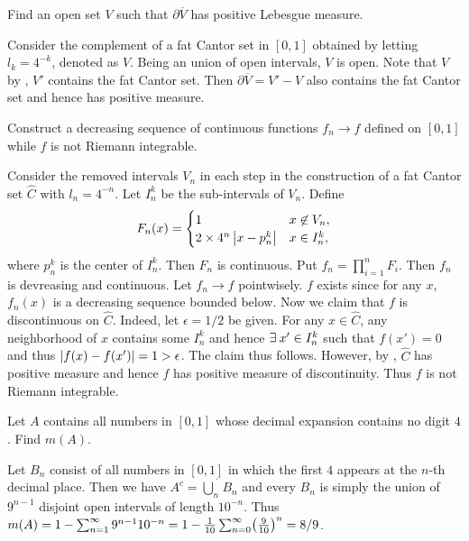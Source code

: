 \begin{exercise}
    Find an open set $V$ such that $\partial \overline{V}$ has 
    positive Lebesgue measure.
\end{exercise}
\begin{pf}
    Consider the complement of a fat Cantor set in $[0,1]$ 
    obtained by letting $l_k = 4^{-k}$, denoted as $V$. 
    Being an union of open intervals, $V$ is open. Note that 
    $V$ by , $V'$ contains the fat Cantor set. 
    Then $\partial \overline{V} = V'-V$ also contains the fat
    Cantor set and hence has positive measure.
\end{pf}

\begin{exercise}
    Construct a decreasing sequence of continuous functions 
    $f_n\to f$ defined on $[0,1]$ while $f$ is not Riemann 
    integrable.
\end{exercise}
\begin{pf}
    Consider the removed intervals $V_n$ in each step in the 
    construction of a fat Cantor set $\hat{C}$ with 
    $l_n = 4^{-n}$. Let $I^k_n$ be the sub-intervals of $V_n$. 
    Define 
    \[
        F_n(x) = \begin{cases}
            1 & \text{$x\not\in V_n$},\\
            2\times4^n\left\lvert {x-p^k_n} \right\rvert & \text{$x\in I^k_n$},
        \end{cases}
    \]
    where $p^k_n$ is the center of $I^k_n$. Then $F_n$ is 
    continuous. Put $f_n = \prod_{i=1}^{n}F_i$. Then $f_n$ is
    devreasing and continuous. Let $f_n\to f$ pointwisely. $f$
    exists since for any $x$, $f_n(x)$ is a decreasing 
    sequence bounded below. Now we claim that $f$ is 
    discontinuous on $\hat{C}$. Indeed, let $\epsilon = 1/2$ 
    be given. For any $x\in\hat{C}$, any neighborhood of $x$ 
    contains some $I^k_n$ and hence $\exists\: x'\in I^k_n$ such 
    that $f(x') = 0$ and thus $\left\lvert {f(x)-f(x')} \right\rvert = 1>\epsilon$.
    The claim thus follows. However, by , 
    $\hat{C}$ has positive measure and hence $f$ has positive
    measure of discontinuity. Thus $f$ is not Riemann 
    integrable.
\end{pf}

\begin{exercise}
    Let $A$ contains all numbers in $[0,1]$ whose decimal 
    expansion contains no digit $4$. Find $m(A)$.
\end{exercise}
\begin{pf}
    Let $B_n$ consist of all numbers in $[0,1]$ in which the 
    first $4$ appears at the $n$-th decimal place. Then we 
    have $A^c = \dot{\bigcup_n} B_n$ and every $B_n$ is simply
    the union of $9^{n-1}$ disjoint open intervals of length 
    $10^{-n}$. Thus $m(A) = 1 - \sum_{n=1}^{\infty} 
    9^{n-1}10^{-n} = 1 - \frac{1}{10}\sum_{n=0}^{\infty} 
    \pth{\frac{9}{10}}^n = 8/9$.  
\end{pf}


